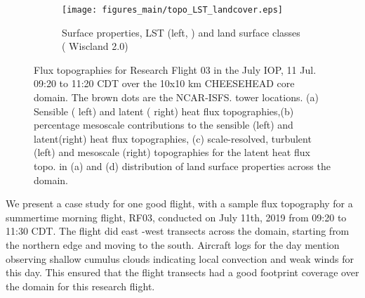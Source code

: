 \documentclass[draft]{agujournal2019}
\begin{document}
\begin{figure}[hbtp]
\begin{subfigure}{\textwidth}
         \label{fig:topo_LE_turb_meso}
     \end{subfigure}
     \begin{subfigure}{\textwidth}
         \texttt{[image: figures\_main/topo\_LST\_landcover.eps]}
         \caption{Surface properties, LST (left, \cite{desai_multisensor_2021}) and land surface classes ( Wiscland 2.0) }
         \label{fig:topo_LST_land}
     \end{subfigure}
        \caption{Flux topographies for Research Flight 03 in the July IOP, 11 Jul. 09:20 to 11:20 CDT over the 10x10 km CHEESEHEAD core domain. The brown dots are the NCAR-ISFS. tower locations. (a) Sensible ( left) and latent ( right) heat flux topographies,(b) percentage mesoscale contributions to the sensible (left) and latent(right) heat flux topographies, (c) scale-resolved, turbulent (left) and mesoscale (right) topographies for the latent heat flux topo. in (a) and (d) distribution of land surface properties across the domain. }
        \label{fig:topo}
 \end{figure}
 
We present a case study for one good flight, with a sample flux topography for a summertime morning flight, RF03, conducted on July 11th, 2019 from 09:20 to 11:30 CDT. The flight did east -west transects across the domain, starting from the northern edge and moving to the south.  Aircraft logs for the day mention observing shallow cumulus clouds indicating local convection and weak winds for this day. This ensured that the flight transects had a good footprint coverage over the domain for this research flight. 
\end{document}
